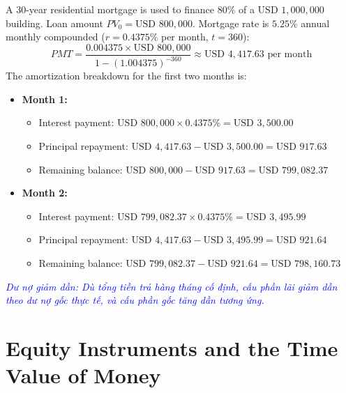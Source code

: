 \begin{tcolorbox}[
	colback=gray!5!white,
	colframe=black!15!white,
	boxrule=0.5pt,
	arc=3pt,
	title=\textbf{Case Study: Mortgage Cash Flow Amortization},
	coltitle=black,
	colbacktitle=black!5!white,
	before skip=6pt,
	after skip=6pt,
	breakable
]
A 30-year residential mortgage is used to finance $80\%$ of a $\text{USD } 1,000,000$ building. Loan amount $PV_0 = \text{USD } 800,000$. Mortgage rate is $5.25\%$ annual monthly compounded ($r = 0.4375\%$ per month, $t = 360$):
\[ PMT = \frac{0.004375 \times \text{USD } 800,000}{1 - (1.004375)^{-360}} \approx \text{USD } 4,417.63 \text{ per month} \]
The amortization breakdown for the first two months is:
\begin{itemize}
	\item \textbf{Month 1:}
	      \begin{itemize}
		      \item Interest payment: $\text{USD } 800,000 \times 0.4375\% = \text{USD } 3,500.00$
		      \item Principal repayment: $\text{USD } 4,417.63 - \text{USD } 3,500.00 = \text{USD } 917.63$
		      \item Remaining balance: $\text{USD } 800,000 - \text{USD } 917.63 = \text{USD } 799,082.37$
	      \end{itemize}
	\item \textbf{Month 2:}
	      \begin{itemize}
		      \item Interest payment: $\text{USD } 799,082.37 \times 0.4375\% = \text{USD } 3,495.99$
		      \item Principal repayment: $\text{USD } 4,417.63 - \text{USD } 3,495.99 = \text{USD } 921.64$
		      \item Remaining balance: $\text{USD } 799,082.37 - \text{USD } 921.64 = \text{USD } 798,160.73$
	      \end{itemize}
\end{itemize}

\textcolor{blue}{\textit{Dư nợ giảm dần: Dù tổng tiền trả hàng tháng cố định, cấu phần lãi giảm dần theo dư nợ gốc thực tế, và cấu phần gốc tăng dần tương ứng.}}
\end{tcolorbox}

\section{Equity Instruments and the Time Value of Money}
\label{sec:Equity Instruments and the Time Value of Money}

